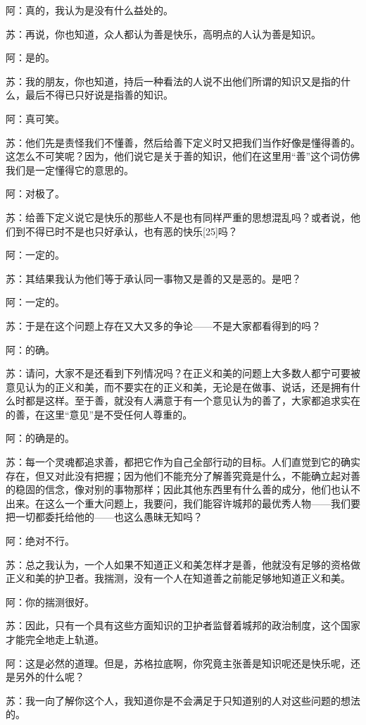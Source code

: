 \documentclass[12pt,oneside]{book}
\begin{document}
阿：真的，我认为是没有什么益处的。

苏：再说，你也知道，众人都认为善是快乐，高明点的人认为善是知识。

阿：是的。

苏：我的朋友，你也知道，持后一种看法的人说不出他们所谓的知识又是指的什么，最后不得已只好说是指善的知识。

阿：真可笑。

苏：他们先是责怪我们不懂善，然后给善下定义时又把我们当作好像是懂得善的。这怎么不可笑呢？因为，他们说它是关于善的知识，他们在这里用“善”这个词仿佛我们是一定懂得它的意思的。

阿：对极了。

苏：给善下定义说它是快乐的那些人不是也有同样严重的思想混乱吗？或者说，他们到不得已时不是也只好承认，也有恶的快乐[25]吗？

阿：一定的。

苏：其结果我认为他们等于承认同一事物又是善的又是恶的。是吧？

阿：一定的。

苏：于是在这个问题上存在又大又多的争论——不是大家都看得到的吗？

阿：的确。

苏：请问，大家不是还看到下列情况吗？在正义和美的问题上大多数人都宁可要被意见认为的正义和美，而不要实在的正义和美，无论是在做事、说话，还是拥有什么时都是这样。至于善，就没有人满意于有一个意见认为的善了，大家都追求实在的善，在这里“意见”是不受任何人尊重的。

阿：的确是的。

苏：每一个灵魂都追求善，都把它作为自己全部行动的目标。人们直觉到它的确实存在，但又对此没有把握；因为他们不能充分了解善究竟是什么，不能确立起对善的稳固的信念，像对别的事物那样；因此其他东西里有什么善的成分，他们也认不出来。在这么一个重大问题上，我要问，我们能容许城邦的最优秀人物——我们要把一切都委托给他的——也这么愚昧无知吗？

阿：绝对不行。

苏：总之我认为，一个人如果不知道正义和美怎样才是善，他就没有足够的资格做正义和美的护卫者。我揣测，没有一个人在知道善之前能足够地知道正义和美。

阿：你的揣测很好。

苏：因此，只有一个具有这些方面知识的卫护者监督着城邦的政治制度，这个国家才能完全地走上轨道。

阿：这是必然的道理。但是，苏格拉底啊，你究竟主张善是知识呢还是快乐呢，还是另外的什么呢？

苏：我一向了解你这个人，我知道你是不会满足于只知道别的人对这些问题的想法的。
\end{document}
